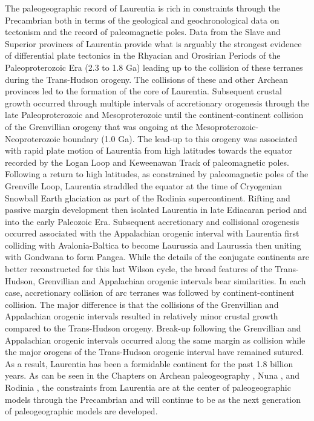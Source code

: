 \documentclass[twocolumn, switch]{article} %
\begin{document}
The paleogeographic record of Laurentia is rich in constraints through the Precambrian both in terms of the geological and geochronological data on tectonism and the record of paleomagnetic poles. Data from the Slave and Superior provinces of Laurentia provide what is arguably the strongest evidence of differential plate tectonics in the Rhyacian and Orosirian Periods of the Paleoproterozoic Era (2.3 to 1.8 Ga) leading up to the collision of these terranes during the Trans-Hudson orogeny. The collisions of these and other Archean provinces led to the formation of the core of Laurentia. Subsequent crustal growth occurred through multiple intervals of accretionary orogenesis through the late Paleoproterozoic and Mesoproterozoic until the continent-continent collision of the Grenvillian orogeny that was ongoing at the Mesoproterozoic-Neoproterozoic boundary (1.0 Ga). The lead-up to this orogeny was associated with rapid plate motion of Laurentia from high latitudes towards the equator recorded by the Logan Loop and Keweenawan Track of paleomagnetic poles. Following a return to high latitudes, as constrained by paleomagnetic poles of the Grenville Loop, Laurentia straddled the equator at the time of Cryogenian Snowball Earth glaciation as part of the Rodinia supercontinent. Rifting and passive margin development then isolated Laurentia in late Ediacaran period and into the early Paleozoic Era. Subsequent accretionary and collisional orogenesis occurred associated with the Appalachian orogenic interval with Laurentia first colliding with Avalonia-Baltica to become Laurussia and Laurussia then uniting with Gondwana to form Pangea. While the details of the conjugate continents are better reconstructed for this last Wilson cycle, the broad features of the Trans-Hudson, Grenvillian and Appalachian orogenic intervals bear similarities. In each case, accretionary collision of arc terranes was followed by continent-continent collision. The major difference is that the collisions of the Grenvillian and Appalachian orogenic intervals resulted in relatively minor crustal growth compared to the Trans-Hudson orogeny. Break-up following the Grenvillian and Appalachian orogenic intervals occurred along the same margin as collision while the major orogens of the Trans-Hudson orogenic interval have remained sutured. As a result, Laurentia has been a formidable continent for the past 1.8 billion years. As can be seen in the Chapters on Archean paleogeography \citep{Salminen2021b}, Nuna \citep{Elming2021a}, and Rodinia \citep{Evans2021b}, the constraints from Laurentia are at the center of paleogeographic models through the Precambrian and will continue to be as the next generation of paleogeographic models are developed.
\end{document}
